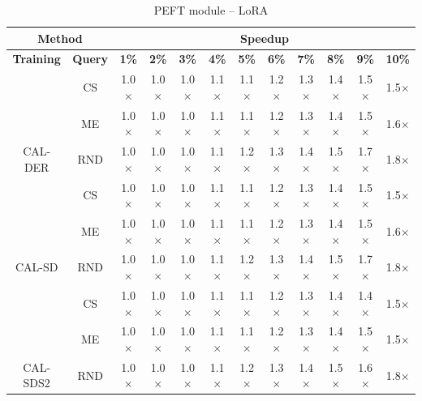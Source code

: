 \begin{table}[htbp]
\centering
\begin{subtable}{\linewidth}
\centering
\caption{PEFT module -- Adapter}

\begin{tabular}{c|c|cccccccccc}
\toprule
\multicolumn{2}{c|}{\textbf{Method}} & \multicolumn{10}{c}{\textbf{Speedup}} \\
\midrule
\textbf{Training} & \textbf{Query} & \textbf{1\%} & \textbf{2\%} & \textbf{3\%} & \textbf{4\%} & \textbf{5\%} & \textbf{6\%} & \textbf{7\%} & \textbf{8\%} & \textbf{9\%} & \textbf{10\%}\\
\midrule
 & CS & 1.0$\times$ & 1.0$\times$ & 1.0$\times$ & 1.1$\times$ & 1.1$\times$ & 1.2$\times$ & 1.3$\times$ & 1.4$\times$ & 1.5$\times$ & 1.5$\times$\\

 & ME & 1.0$\times$ & 1.0$\times$ & 1.0$\times$ & 1.1$\times$ & 1.1$\times$ & 1.2$\times$ & 1.3$\times$ & 1.4$\times$ & 1.5$\times$ & 1.6$\times$\\

\multirow{-3}{*}{\raggedright\arraybackslash CAL-DER} & RND & 1.0$\times$ & 1.0$\times$ & 1.0$\times$ & 1.1$\times$ & 1.2$\times$ & 1.3$\times$ & 1.4$\times$ & 1.5$\times$ & 1.7$\times$ & 1.8$\times$\\
\midrule
 & CS & 1.0$\times$ & 1.0$\times$ & 1.0$\times$ & 1.1$\times$ & 1.1$\times$ & 1.2$\times$ & 1.3$\times$ & 1.4$\times$ & 1.5$\times$ & 1.5$\times$\\

 & ME & 1.0$\times$ & 1.0$\times$ & 1.0$\times$ & 1.1$\times$ & 1.1$\times$ & 1.2$\times$ & 1.3$\times$ & 1.4$\times$ & 1.5$\times$ & 1.6$\times$\\

\multirow{-3}{*}{\raggedright\arraybackslash CAL-SD} & RND & 1.0$\times$ & 1.0$\times$ & 1.0$\times$ & 1.1$\times$ & 1.2$\times$ & 1.3$\times$ & 1.4$\times$ & 1.5$\times$ & 1.7$\times$ & 1.8$\times$\\
\midrule
 & CS & 1.0$\times$ & 1.0$\times$ & 1.0$\times$ & 1.1$\times$ & 1.1$\times$ & 1.2$\times$ & 1.3$\times$ & 1.4$\times$ & 1.4$\times$ & 1.5$\times$\\

 & ME & 1.0$\times$ & 1.0$\times$ & 1.0$\times$ & 1.1$\times$ & 1.1$\times$ & 1.2$\times$ & 1.3$\times$ & 1.4$\times$ & 1.5$\times$ & 1.5$\times$\\

\multirow{-3}{*}{\raggedright\arraybackslash CAL-SDS2} & RND & 1.0$\times$ & 1.0$\times$ & 1.0$\times$ & 1.1$\times$ & 1.2$\times$ & 1.3$\times$ & 1.4$\times$ & 1.5$\times$ & 1.6$\times$ & 1.8$\times$\\
\bottomrule
\end{tabular}
\end{subtable}
\vspace{1em}
\begin{subtable}{\linewidth}
\centering
\caption{PEFT module -- LoRA}


\end{subtable}
\end{table}
